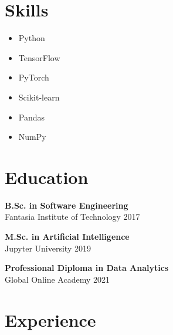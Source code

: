 \documentclass[a4paper,10pt]{article}
\begin{document}
\begin{multicols}{2}

\section*{Skills}


\begin{itemize}[leftmargin=*]

    \item Python

    \item TensorFlow

    \item PyTorch

    \item Scikit-learn

    \item Pandas

    \item NumPy

\end{itemize}



\columnbreak

\section*{Education}

\textbf{ B.Sc. in Software Engineering } \\
Fantasia Institute of Technology \hfill 2017 \\
\vspace{0.4cm}

\textbf{ M.Sc. in Artificial Intelligence } \\
Jupyter University \hfill 2019 \\
\vspace{0.4cm}

\textbf{ Professional Diploma in Data Analytics } \\
Global Online Academy \hfill 2021 \\
\vspace{0.4cm}


\end{multicols}

\vspace{0.5cm}

\section*{Experience}
\end{document}
